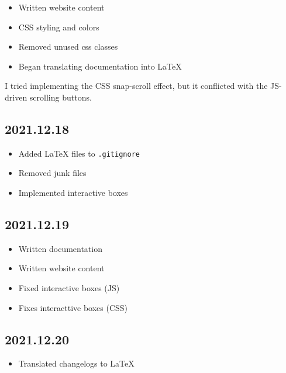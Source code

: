 \documentclass{article}
\begin{document}
\begin{itemize}
    \item Written website content
    \item CSS styling and colors
    \item Removed unused css classes
    \item Began translating documentation into LaTeX
\end{itemize}

I tried implementing the CSS snap-scroll effect,
but it conflicted with the JS-driven scrolling buttons.

\subsection*{2021.12.18}

\begin{itemize}
    \item Added LaTeX files to \texttt{.gitignore}
    \item Removed junk files
    \item Implemented interactive boxes
\end{itemize}

\subsection*{2021.12.19}

\begin{itemize}
    \item Written documentation
    \item Written website content
    \item Fixed interactive boxes (JS)
    \item Fixes interacttive boxes (CSS)
\end{itemize}

\subsection*{2021.12.20}

\begin{itemize}
    \item Translated changelogs to LaTeX
\end{itemize}
\end{document}
